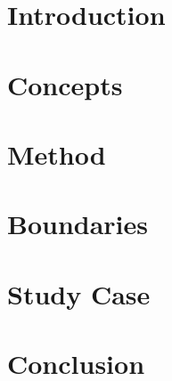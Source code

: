 \documentclass[]{article}
\title{}
\author{Bruno Duarte Correa}
\begin{document}
\maketitle

\begin{abstract}



\end{abstract}



\section{Introduction}




\section{Concepts}


\section{Method}



\section{Boundaries}


\section{Study Case}


\section{Conclusion}





\end{document}
